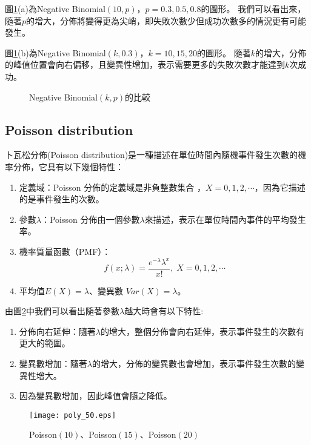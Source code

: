 \documentclass[12pt, a4paper]{article}
\begin{document}
圖\;\ref{fig:parallel3_9}\;(a)\;為\;Negative Binomial$(10, p)$\;，\;$p=0.3,0.5,0.8$\;的圖形。
我們可以看出來，隨著\;$p$\;的增大，分佈將變得更為尖峭，即失敗次數少但成功次數多的情況更有可能發生。

圖\;\ref{fig:parallel3_9}\;(b)\;為\;Negative Binomial$(k, 0.3)$\;，\;$k=10, 15, 20$\;的圖形。
隨著\;$k$\;的增大，分佈的峰值位置會向右偏移，且變異性增加，表示需要更多的失敗次數才能達到\;$k$\;次成功。

\begin{figure}[H]
\centering
{}
\caption{Negative Binomial$(k, p)$的比較}
\label{fig:parallel3_9}
\end{figure}

\subsection{Poisson distribution}
卜瓦松分佈(Poisson distribution)是一種描述在單位時間內隨機事件發生次數的機率分佈，它具有以下幾個特性\;：
\begin{enumerate}
\item 定義域\;：\;Poisson 分佈的定義域是非負整數集合 ，\;$X=0, 1, 2, \cdots$\;，因為它描述的是事件發生的次數。
\item 參數\;$\lambda$\;：Poisson 分佈由一個參數\;$\lambda$\;來描述，表示在單位時間內事件的平均發生率。
\item 機率質量函數（PMF）\;：
$$ f(x;\lambda) = \frac{e^{-\lambda} \lambda^x}{x!},\;X=0, 1, 2, \cdots$$
\item 平均值\;$E(X) =\lambda$\;、變異數 \;$Var(X) = \lambda$\;。
\end{enumerate}

由圖\;\ref{fig:poly_50.eps}\;中我們可以看出隨著參數\;$\lambda$\;越大時會有以下特性\;:
\begin{enumerate}
\item 分佈向右延伸：隨著\;$\lambda$\;的增大，整個分佈會向右延伸，表示事件發生的次數有更大的範圍。
\item 變異數增加：隨著\;$\lambda$\;的增大，分佈的變異數也會增加，表示事件發生次數的變異性增大。
\item 因為變異數增加，因此峰值會隨之降低。
\end{enumerate}

\begin{figure}[H]
\centering
\texttt{[image: poly\_50.eps]}
\caption{Poisson$(10)$、Poisson$(15)$、Poisson$(20)$}
\label{fig:poly_50.eps}
\end{figure}
\end{document}
